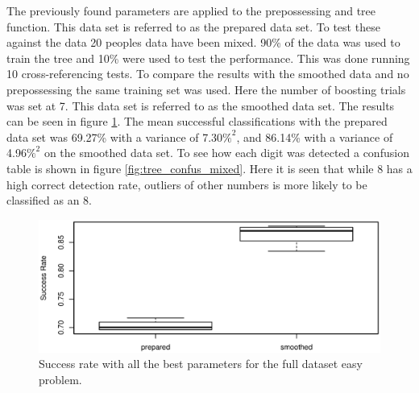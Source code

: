 The previously found parameters are applied to the prepossessing and tree function. 
This data set is referred to as the prepared data set.
To test these against the data 20 peoples data have been mixed.
90\% of the data was used to train the tree and 10\% were used to test the performance.
This was done running 10 cross-referencing tests. 
To compare the results with the smoothed data and no prepossessing the same training set was used.
Here the number of boosting trials was set at 7. 
This data set is referred to as the smoothed data set.
The results can be seen in figure \ref{fig:tree_performance_mixed}.
The mean successful classifications with the prepared data set was 69.27\% with a variance of 7.30\(\%^2\), and 86.14\% with a variance of 4.96\(\%^2\) on the smoothed data set.
To see how each digit was detected a confusion table is shown in figure \ref{fig:tree_confus_mixed}. 
Here it is seen that while 8 has a high correct detection rate, outliers of other numbers is more likely to be classified as an 8.

\begin{figure}[H]
\centering
\includegraphics[width=\textwidth]{graphics/tree_performance_mix_combined}
\caption[Success for decision tree on the easy problem.]{Success rate with all the best parameters for the full dataset easy problem.}
\label{fig:tree_performance_mixed}
\end{figure}

